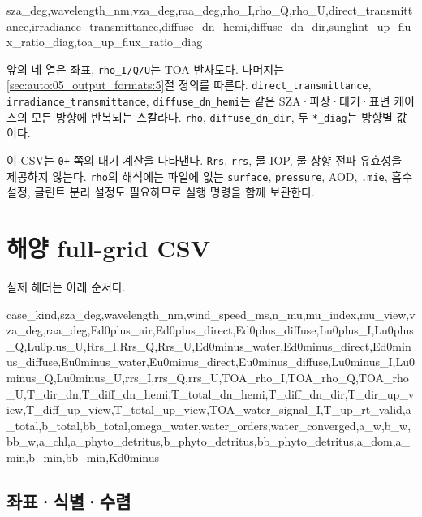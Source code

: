 \begin{ManualCode}
sza_deg,wavelength_nm,vza_deg,raa_deg,rho_I,rho_Q,rho_U,direct_transmittance,irradiance_transmittance,diffuse_dn_hemi,diffuse_dn_dir,sunglint_up_flux_ratio_diag,toa_up_flux_ratio_diag
\end{ManualCode}

앞의 네 열은 좌표, \texttt{rho\_\allowbreak{}I/\allowbreak{}Q/\allowbreak{}U}는 TOA 반사도다. 나머지는 \ref{sec:auto:05_output_formats:5}절 정의를 따른다. \texttt{direct\_\allowbreak{}transmittance}, \texttt{irradiance\_\allowbreak{}transmittance}, \texttt{diffuse\_\allowbreak{}dn\_\allowbreak{}hemi}는 같은 SZA·파장·대기·표면 케이스의 모든 방향에 반복되는 스칼라다. \texttt{rho}, \texttt{diffuse\_\allowbreak{}dn\_\allowbreak{}dir}, 두 \texttt{*\_\allowbreak{}diag}는 방향별 값이다.

이 CSV는 \texttt{0+} 쪽의 대기 계산을 나타낸다. \texttt{Rrs}, \texttt{rrs}, 물 IOP, 물 상향 전파 유효성을 제공하지 않는다. \texttt{rho}의 해석에는 파일에 없는 \texttt{surface}, \texttt{pressure}, AOD, \texttt{.\allowbreak{}mie}, 흡수 설정, 글린트 분리 설정도 필요하므로 실행 명령을 함께 보관한다.

\section{해양 full-grid CSV}
\label{sec:auto:05_output_formats:7}
실제 헤더는 아래 순서다.


\begin{ManualCode}
case_kind,sza_deg,wavelength_nm,wind_speed_ms,n_mu,mu_index,mu_view,vza_deg,raa_deg,Ed0plus_air,Ed0plus_direct,Ed0plus_diffuse,Lu0plus_I,Lu0plus_Q,Lu0plus_U,Rrs_I,Rrs_Q,Rrs_U,Ed0minus_water,Ed0minus_direct,Ed0minus_diffuse,Eu0minus_water,Eu0minus_direct,Eu0minus_diffuse,Lu0minus_I,Lu0minus_Q,Lu0minus_U,rrs_I,rrs_Q,rrs_U,TOA_rho_I,TOA_rho_Q,TOA_rho_U,T_dir_dn,T_diff_dn_hemi,T_total_dn_hemi,T_diff_dn_dir,T_dir_up_view,T_diff_up_view,T_total_up_view,TOA_water_signal_I,T_up_rt_valid,a_total,b_total,bb_total,omega_water,water_orders,water_converged,a_w,b_w,bb_w,a_chl,a_phyto_detritus,b_phyto_detritus,bb_phyto_detritus,a_dom,a_min,b_min,bb_min,Kd0minus
\end{ManualCode}

\subsection{좌표·식별·수렴}
\label{sec:auto:05_output_formats:7.1}


